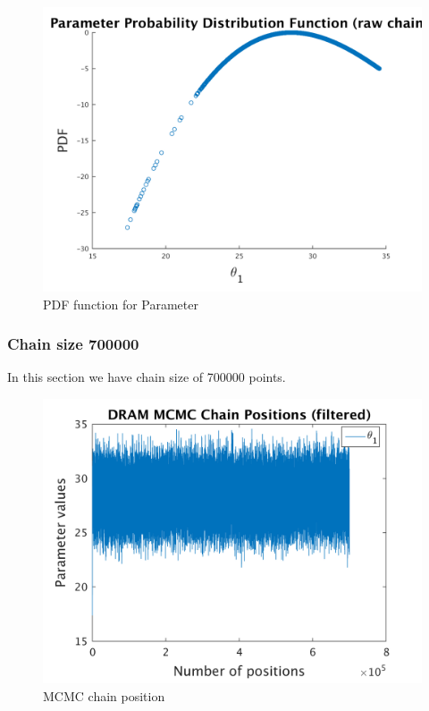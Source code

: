 \begin{figure}[H]
  
  \centering
   \includegraphics[scale=0.75]{53_results/output_300000/ip_logLike_unified}
   \caption{PDF function for Parameter }
\end{figure}


%
\subsubsection{Chain size 700000 }


In this section we have chain size of 700000 points. 

\begin{figure}[H]
  
  \centering
   \includegraphics[scale=0.75]{53_results/output_700000/simple_ip_chain_pos_filt}
   \caption{MCMC chain position }
\end{figure}


